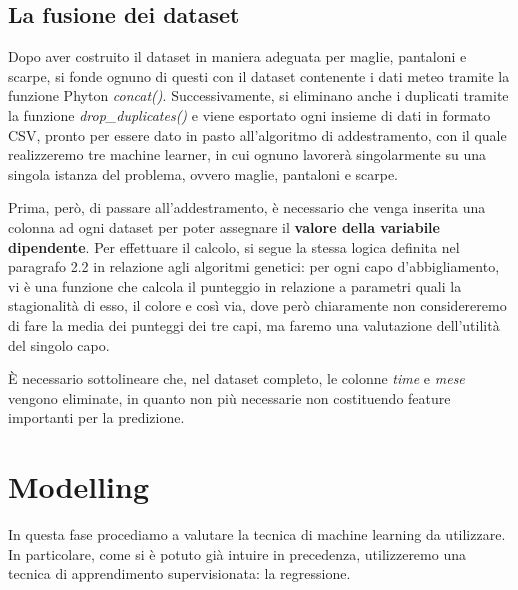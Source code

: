 \documentclass[a4paper, 11pt, oneside]{report}
\begin{document}
                \bigskip

                \subsection{La fusione dei dataset}
                Dopo aver costruito il dataset in maniera adeguata per maglie, pantaloni e scarpe, si fonde ognuno di
                questi con il dataset contenente i dati meteo tramite la funzione Phyton \textit{concat()}. Successivamente,
                si eliminano anche i duplicati tramite la funzione \textit{drop\_duplicates()} e viene esportato ogni insieme
                di dati in formato CSV, pronto per essere dato in pasto all'algoritmo di addestramento, con il quale realizzeremo
                tre machine learner, in cui ognuno lavorerà singolarmente su una singola istanza del problema, ovvero maglie, pantaloni
                e scarpe.\\
                \par \noindent Prima, però, di passare all'addestramento,
                è necessario che venga inserita una colonna ad ogni dataset per poter assegnare il \textbf{valore della variabile dipendente}.
                Per effettuare il calcolo, si segue la stessa logica definita nel paragrafo 2.2 in relazione agli algoritmi genetici:
                per ogni capo d'abbigliamento, vi è una funzione che calcola il punteggio in relazione a parametri quali la stagionalità
                di esso, il colore e così via, dove però chiaramente non considereremo di fare la media dei punteggi dei
                tre capi, ma faremo una valutazione dell'utilità del singolo capo.\\
                \par \noindent \`E necessario sottolineare che, nel dataset completo, le colonne \textit{time}
                e \textit{mese} vengono eliminate, in quanto non più necessarie non costituendo feature importanti per la predizione.

            \newpage
            \section{Modelling}
            In questa fase procediamo a valutare la tecnica di machine learning da utilizzare. In particolare, come si è
            potuto già intuire in precedenza, utilizzeremo una tecnica di apprendimento supervisionata: la
            regressione.
\end{document}
